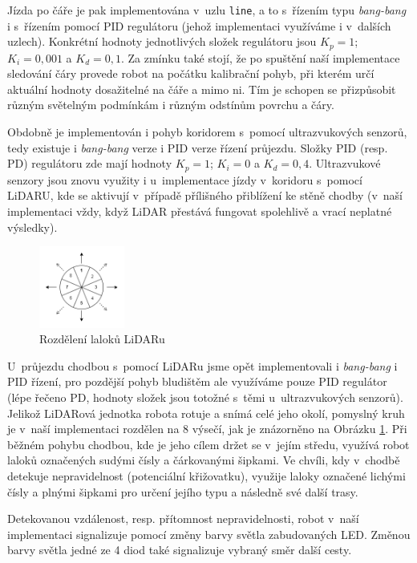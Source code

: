 Jízda po čáře je pak implementována v~uzlu \texttt{line}, a to s~řízením typu \textit{bang-bang} i s~řízením pomocí PID regulátoru (jehož implementaci využíváme i v~dalších uzlech). Konkrétní hodnoty jednotlivých složek regulátoru jsou ${K_p=1}$; ${K_i=0,001}$ a ${K_d=0,1}$. Za zmínku také stojí, že po spuštění naší implementace sledování čáry provede robot na počátku kalibrační pohyb, při kterém určí aktuální hodnoty dosažitelné na čáře a mimo ni. Tím je schopen se přizpůsobit různým světelným podmínkám i různým odstínům povrchu a čáry.

Obdobně je implementován i pohyb koridorem s~pomocí ultrazvukových senzorů, tedy existuje i \textit{bang-bang} verze i PID verze řízení průjezdu. Složky PID (resp. PD) regulátoru zde mají hodnoty ${K_p=1}$; ${K_i=0}$ a ${K_d=0,4}$. Ultrazvukové senzory jsou znovu využity i u~implementace jízdy v~koridoru s~pomocí LiDARU, kde se aktivují v~případě přílišného přiblížení ke stěně chodby (v~naší implementaci vždy, když LiDAR přestává fungovat spolehlivě a vrací neplatné výsledky).

\begin{figure}[h]
    \centering
    \includegraphics[width=0.25\textwidth]{images/lidar_circle.png}
    \caption{Rozdělení laloků LiDARu}
    \label{fig:lidar_obr}
\end{figure}

U~průjezdu chodbou s~pomocí LiDARu jsme opět implementovali i \textit{bang-bang} i PID řízení, pro pozdější pohyb bludištěm ale využíváme pouze PID regulátor (lépe řečeno PD, hodnoty složek jsou totožné s~těmi u~ultrazvukových senzorů). Jelikož LiDARová jednotka robota rotuje a snímá celé jeho okolí, pomyslný kruh je v~naší implementaci rozdělen na 8 výsečí, jak je znázorněno na Obrázku \ref{fig:lidar_obr}. Při běžném pohybu chodbou, kde je jeho cílem držet se v~jejím středu, využívá robot laloků označených sudými čísly a čárkovanými šipkami. Ve chvíli, kdy v~chodbě detekuje nepravidelnost (potenciální křižovatku), využije laloky označené lichými čísly a plnými šipkami pro určení jejího typu a následně své další trasy.

Detekovanou vzdálenost, resp. přítomnost nepravidelnosti, robot v~naší implementaci signalizuje pomocí změny barvy světla zabudovaných LED. Změnou barvy světla jedné ze 4 diod také signalizuje vybraný směr další cesty.

